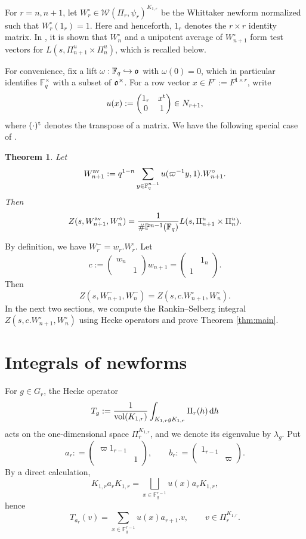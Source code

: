 \documentclass[11pt, a4paper]{amsart}
\newcommand{\BF}{{\mathbb {F}}}
\newcommand{\CW}{{\mathcal {W}}}
\newcommand{\od}{\operatorname{d}}
\newcommand{\be}{\begin {equation}}
\newcommand{\ee}{\end {equation}}
\theoremstyle{plain}
\theoremstyle{plain}
\theoremstyle{plain}
\newtheorem{thml}[lem]{Theorem}
\theoremstyle{plain}
\theoremstyle{remark}
\theoremstyle{definition}
\theoremstyle{plain}
\numberwithin{equation}{section}
\begin{document}
For $r=n, n+1$, let $W_r^\circ\in \CW(\Pi_r, \psi_r)^{K_{1,r}}$ be the Whittaker newform normalized such that $W_r^\circ(1_r)=1$. Here and henceforth, $1_r$ denotes the $r\times r$ identity matrix. 
In \cite{BKL}, it is shown that $W_n^\circ$ and a unipotent average of $W_{n+1}^\circ$ form test vectors for $L(s, \Pi_{n+1}^u \times \Pi_n^u)$, which is recalled below.

For convenience, fix a lift $\omega: \mathbb{F}_q \hookrightarrow \frak o$ with $\omega(0)=0$, which in particular identifies $\mathbb{F}_q^\times$ with a subset of $\frak o^\times$. 
For a row vector $x\in F^r:=F^{1\times r}$, write
\[
u(x): = \begin{pmatrix} 1_r & x^{\rm t} \\ 0 & 1\end{pmatrix}\in N_{r+1},
\]
where $(\cdot)^{\rm t}$ denotes the transpose of a matrix. We have the following special case of \cite{BKL}.

\begin{thml} \label{BKL}
Let
\[
W_{n+1}^{\rm av} : = q^{1-n} \sum_{y\in \BF_q^{n-1}} u(\varpi^{-1}y, 1).W_{n+1}^\circ.
\]
Then 
\[
Z(s, W_{n+1}^{\rm av}, W_n^\circ) = \frac{1}{\#\mathbb{P}^{n-1}(\mathbb{F}_q)}L(s, \Pi_{n+1}^u\times \Pi_n^u).
\]
\end{thml}

By definition, we have
$W_r^- = w_r. W_r^\circ$.
Let 
\be \label{c}
c:= \begin{pmatrix} w_n \\ & 1\end{pmatrix} w_{n+1} = \begin{pmatrix} & 1_n \\ 1 & \end{pmatrix}.
\ee
Then 
\be \label{RSeq}
Z(s, W_{n+1}^-, W_n^-) = Z(s, c. W_{n+1}^\circ, W_n^\circ).
\ee
In the next two sections, we compute the Rankin--Selberg integral $Z(s, c.W_{n+1}^\circ, W_n^\circ)$ using Hecke operators and prove Theorem \ref{thm:main}. 



\section{Integrals of newforms} \label{sec3}

For $g\in G_r$, the Hecke operator 
\[
T_g: = \frac{1}{{\rm vol}(K_{1,r})}\int_{K_{1,r} g K_{1, r}} \Pi_r(h) \od\!h
\]
acts on the one-dimensional space $\Pi_r^{K_{1,r}}$, and we denote its eigenvalue by $\lambda_g$. 
Put 
\be \label{ab}
a_r: = \begin{pmatrix} \varpi 1_{r-1} \\ & 1\end{pmatrix},\qquad  b_r: = \begin{pmatrix} 1_{r-1} \\ & \varpi\end{pmatrix}.
\ee
By a direct calculation, 
\[
K_{1,r} a_r K_{1,r} = \bigsqcup_{x\in \mathbb{F}_q^{r-1}} u(x) a_r K_{1,r},
\]
hence
\be \label{hecke}
T_{a_r}(v) = \sum_{x\in \mathbb{F}_q^{r-1}} u(x)a_{r+1}. v,\qquad v\in \Pi_r^{K_{1,r}}.
\ee
\end{document}
